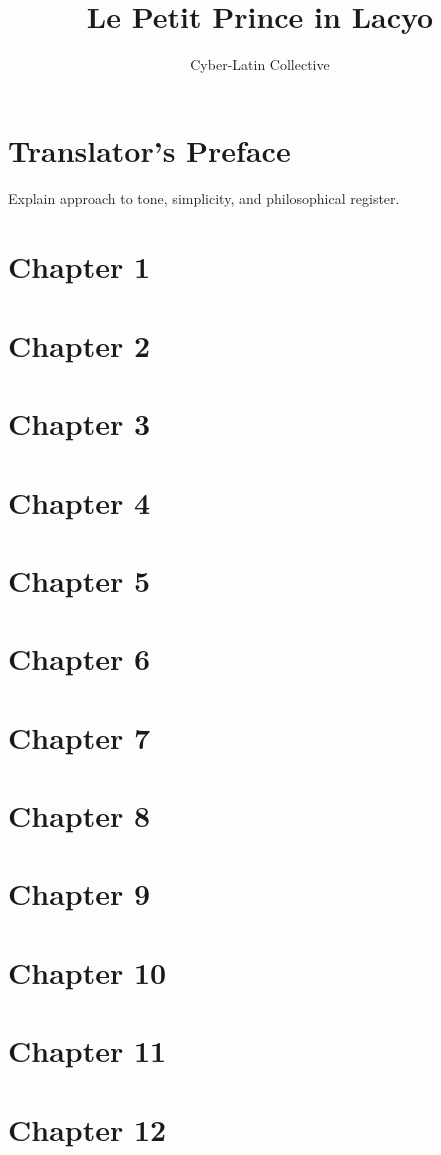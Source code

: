 \documentclass[12pt]{book}
\title{Le Petit Prince in Lacyo}
\author{Cyber-Latin Collective}
\date{}
\begin{document}
\maketitle
\tableofcontents

\chapter{Translator's Preface}
Explain approach to tone, simplicity, and philosophical register.

\chapter{Chapter 1}
\chapter{Chapter 2}
\chapter{Chapter 3}
\chapter{Chapter 4}
\chapter{Chapter 5}
\chapter{Chapter 6}
\chapter{Chapter 7}
\chapter{Chapter 8}
\chapter{Chapter 9}
\chapter{Chapter 10}
\chapter{Chapter 11}
\chapter{Chapter 12}
\end{document}
